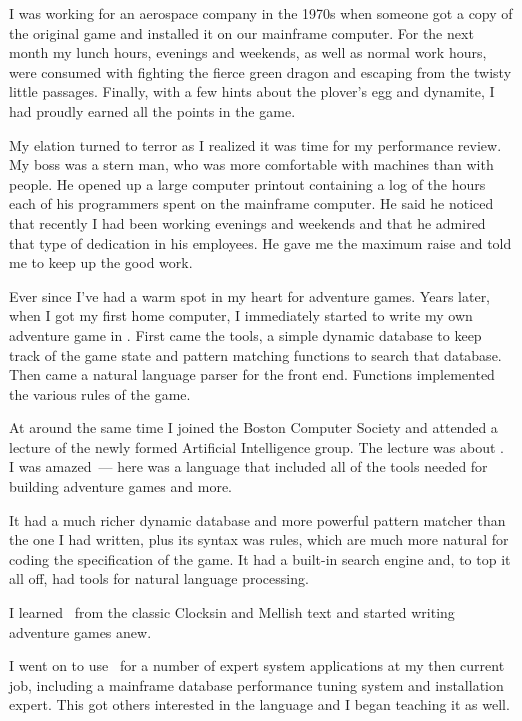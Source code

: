 
I was working for an aerospace company in the 1970s when someone got a copy of
the original  game and installed it on our mainframe computer.
For the next month my lunch hours, evenings and weekends, as well as normal work
hours, were consumed with fighting the fierce green dragon and escaping from the
twisty little passages. Finally, with a few hints about the plover's egg and
dynamite, I had proudly earned all the points in the game.

My elation turned to terror as I realized it was time for my performance review.
My boss was a stern man, who was more comfortable with machines than with
people. He opened up a large computer printout containing a log of the hours
each of his programmers spent on the mainframe computer. He said he noticed that
recently I had been working evenings and weekends and that he admired that type
of dedication in his employees. He gave me the maximum raise and told me to keep
up the good work.

Ever since I've had a warm spot in my heart for adventure games. Years later,
when I got my first home computer, I immediately started to write my own
adventure game in \ci. First came the tools, a simple dynamic database to keep
track of the game state and pattern matching functions to search that database.
Then came a natural language parser for the front end. Functions implemented the
various rules of the game.

At around the same time I joined the Boston Computer Society and attended a
lecture of the newly formed Artificial Intelligence group. The lecture was about
\prolog. I was amazed\ --- here was a language that included all of the tools
needed for building adventure games and more.

It had a much richer dynamic database and more powerful pattern matcher than the
one I had written, plus its syntax was rules, which are much more natural for
coding the specification of the game. It had a built-in search engine and, to
top it all off, had tools for natural language processing.

I learned \prolog\ from the classic Clocksin and Mellish \cite{clocksin} text
and started writing adventure games anew.

I went on to use \prolog\ for a number of expert system applications at my then
current job, including a mainframe database performance tuning system and
installation expert. This got others interested in the language and I began
teaching it as well.

